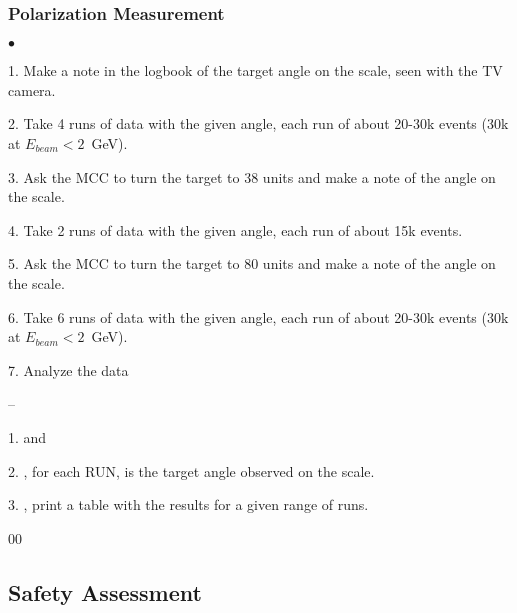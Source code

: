 {\subsubsection {Polarization Measurement }
\label{sec:polmeas}

\begin{list}{$\bullet$}{\setlength{\itemsep}{0.cm}}
  \item[1.] Make a note in the logbook of the target angle on the scale, 
            seen with the TV camera.  
  \item[2.] Take 4 runs of data with the given angle, each run of about 20-30k
            events (30k at $E_{beam}<2$~GeV).
  \item[3.] Ask the MCC to turn the target to 38 units 
            and make a note of the angle on the scale.
  \item[4.] Take 2 runs of data with the given angle, each run of about 15k events.
  \item[5.] Ask the MCC to turn the target to 80 units
            and make a note of the angle on the scale.
  \item[6.] Take 6 runs of data with the given angle, each run of about 20-30k
            events (30k at $E_{beam}<2$~GeV).
  \item[7.] Analyze the data
        \begin{list}{--}{\setlength{\itemsep}{0.cm}}
             \item[1.]  and
             \item[2.] , for each RUN,
                        is the target angle observed on the scale.
             \item[3.] , print a table
                       with the results for a given range of runs.
        \end{list}
\end{list}

}
\begin{safetyen}{0}{0}
\subsection {Safety Assessment}
\label{sec:moller_safety}
\end{safetyen}


